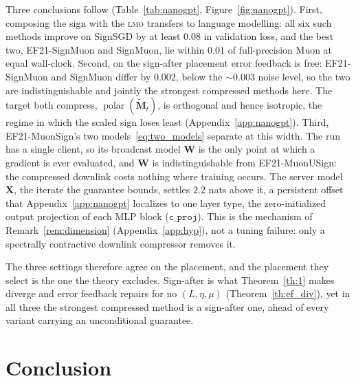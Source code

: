 Three conclusions follow (Table~\ref{tab:nanogpt}, Figure~\ref{fig:nanogpt}). First, composing the sign with the \textsc{lmo} transfers to language modelling: all six such methods improve on SignSGD by at least $0.08$ in validation loss, and the best two, EF21-SignMuon and SignMuon, lie within $0.01$ of full-precision Muon at equal wall-clock. Second, on the sign-after placement error feedback is free: EF21-SignMuon and SignMuon differ by $0.002$, below the ${\sim}0.003$ noise level, so the two are indistinguishable and jointly the strongest compressed methods here. The target both compress, $\operatorname{polar}(\tilde{\mathbf{M}}_t)$, is orthogonal and hence isotropic, the regime in which the scaled sign loses least (Appendix~\ref{app:nanogpt}). Third, EF21-MuonSign's two models~\eqref{eq:two_models} separate at this width. The run has a single client, so its broadcast model $\mathbf{W}$ is the only point at which a gradient is ever evaluated, and $\mathbf{W}$ is indistinguishable from EF21-MuonUSign: the compressed downlink costs nothing where training occurs. The server model $\mathbf{X}$, the iterate the guarantee bounds, settles $2.2$ nats above it, a persistent offset that Appendix~\ref{app:nanogpt} localizes to one layer type, the zero-initialized output projection of each MLP block ($\mathtt{c\_proj}$). This is the mechanism of Remark~\ref{rem:dimension} (Appendix~\ref{app:hyp}), not a tuning failure: only a spectrally contractive downlink compressor removes it.

The three settings therefore agree on the placement, and the placement they select is the one the theory excludes. Sign-after is what Theorem~\ref{th:1} makes diverge and error feedback repairs for no $(L,\eta,\mu)$ (Theorem~\ref{th:ef_div}), yet in all three the strongest compressed method is a sign-after one, ahead of every variant carrying an unconditional guarantee.

\section{Conclusion}\label{sec:conclusion}


